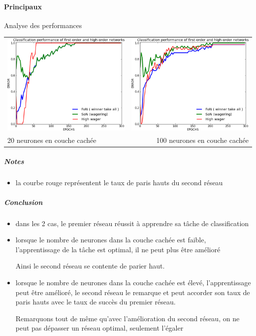     \paragraph{Principaux}
      Analyse des performances
      \begin{center}
	\begin{tabular}{lr}
	  \hspace*{-1cm}
	  \includegraphics[width=250px]{data/expC1/perf_20.png}
	  &
	  \includegraphics[width=250px]{data/expC1/perf_100.png} \\
	  
	  20 neurones en couche cachée
	  &
	  \hspace*{-1cm}
	  100 neurones en couche cachée
	\end{tabular}
      \end{center}
      \subparagraph{Notes}
	\begin{itemize}
	  \item la courbe rouge représentent le taux de paris hauts du second réseau
	\end{itemize}
      \subparagraph{Conclusion}
	\begin{itemize}
	  \item dans les 2 cas, le premier réseau réussit à apprendre sa tâche de classification
	  \item lorsque le nombre de neurones dans la couche cachée est faible, l'apprentissage de la tâche est optimal, il ne peut plus être amélioré
	  
	  Ainsi le second réseau se contente de parier haut.
	  \item lorsque le nombre de neurones dans la couche cachée est élevé, l'apprentissage peut être amélioré, le second réseau 
	  le remarque et peut accorder son taux de paris hauts avec le taux de succès du premier réseau.
	  
	  Remarquons tout de même qu'avec l'amélioration du second réseau, on ne peut pas dépasser un réseau optimal, seulement l'égaler
	\end{itemize}
